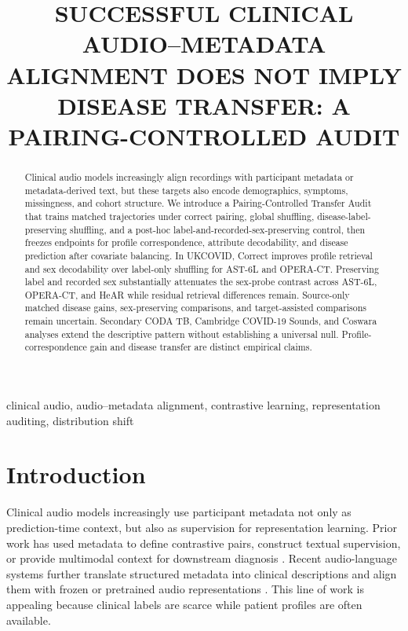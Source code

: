\documentclass{article}
\title{SUCCESSFUL CLINICAL AUDIO--METADATA ALIGNMENT DOES NOT IMPLY\\
DISEASE TRANSFER: A PAIRING-CONTROLLED AUDIT}
\begin{document}
\ninept
\maketitle
\begin{abstract}
Clinical audio models increasingly align recordings with participant metadata
or metadata-derived text, but these targets also encode demographics, symptoms,
missingness, and cohort structure. We introduce a Pairing-Controlled Transfer
Audit that trains matched trajectories under correct pairing, global shuffling,
disease-label-preserving shuffling, and a post-hoc
label-and-recorded-sex-preserving control, then freezes endpoints for profile
correspondence, attribute decodability, and disease prediction after covariate
balancing. In UKCOVID, Correct improves profile retrieval and sex decodability
over label-only shuffling for AST-6L and OPERA-CT. Preserving label and recorded
sex substantially attenuates the sex-probe contrast across AST-6L, OPERA-CT,
and HeAR while residual retrieval differences remain. Source-only matched
disease gains, sex-preserving comparisons, and target-assisted comparisons
remain uncertain. Secondary CODA TB, Cambridge COVID-19 Sounds, and Coswara
analyses extend the descriptive pattern without establishing a universal null.
Profile-correspondence gain and disease transfer are distinct empirical claims.
\end{abstract}

\begin{keywords}
clinical audio, audio--metadata alignment, contrastive learning,
representation auditing, distribution shift
\end{keywords}

\section{Introduction}
\label{sec:intro}

Clinical audio models increasingly use participant metadata not only as
prediction-time context, but also as supervision for representation learning.
Prior work has used metadata to define contrastive pairs, construct textual
supervision, or provide multimodal context for downstream diagnosis
\cite{soni2022contrastive,moummad2023metadata,kim2024bts,siam2026respiramfm}.
Recent audio-language systems further translate structured metadata into
clinical descriptions and align them with frozen or pretrained audio
representations \cite{ilerisoy2026zeroshot,ando2025slap}. This line of work is
appealing because clinical labels are scarce while patient profiles are often
available.
\end{document}
